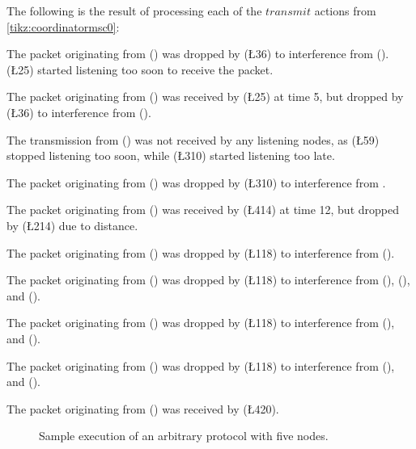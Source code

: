 The following is the result of processing each of the $transmit$ actions from \autoref{tikz:coordinatormsc0}: %
%
\begin{description}[leftmargin=2em,style=nextline]
    \item[\T{4}{3}] The packet originating from  () was dropped by  (\L{3}{6}) to interference from  ().  (\L{2}{5}) started listening too soon to receive the packet.
    \item[\T{1}{5}] The packet originating from  () was received by  (\L{2}{5}) at time 5, but dropped by  (\L{3}{6}) to interference from  (). 
    \item[\T{1}{10}] The transmission from  () was not received by any listening nodes, as  (\L{5}{9}) stopped listening too soon, while  (\L{3}{10}) started listening too late.
    \item[\T{2}{10}] The packet originating from  () was dropped by  (\L{3}{10}) to interference from .
    \item[\T{5}{12}] The packet originating from  () was received by  (\L{4}{14}) at time 12, but dropped by  (\L{2}{14}) due to distance.
    \item[\T{3}{16}] The packet originating from  () was dropped by  (\L{1}{18}) to interference from  (). 
    \item[\T{4}{17}] The packet originating from  () was dropped by  (\L{1}{18}) to interference from  (),  (), and  ().
    \item[\T{2}{18}] The packet originating from  () was dropped by  (\L{1}{18}) to interference from  (), and  ().
    \item[\T{5}{18}] The packet originating from  () was dropped by  (\L{1}{18}) to interference from  (), and  ().
    \item[\T{3}{20}] The packet originating from  () was received by  (\L{4}{20}).
\end{description}

\begin{figure}[H]
    \centering
    \CoordinatorFigure{}
    \caption{Sample execution of an arbitrary protocol with five nodes.}\label{tikz:coordinatormsc0}
\end{figure}

